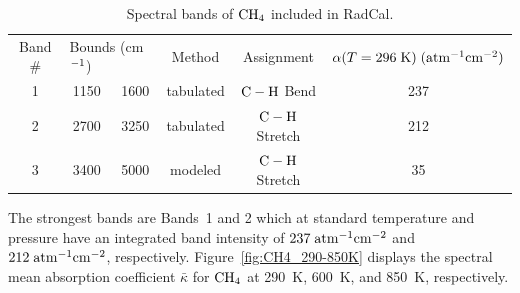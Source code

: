 \begin{table}[ht]
      \centering
      \caption{Spectral bands of $\rm CH_4$ included in RadCal.}
      \label{Table::CH4}
    \begin{tabular}{|c|c|c|c|c|c|}
    \hline
    Band \# & \multicolumn{2}{|l|}{Bounds (cm$\rm ^{-1}$) } & Method & Assignment & $\alpha(T=296 \; {\rm K}) \; (\rm {atm^{-1} cm^{-2}})$   \\
    \cline{1-6}
    1 & 1150 & 1600 & tabulated &  $\rm C-H$ Bend    & 237  \\
    2 & 2700 & 3250 & tabulated &  $\rm C-H$ Stretch & 212  \\
    3 & 3400 & 5000 & modeled   &  $\rm C-H$ Stretch &  35  \\
    \hline
   \end{tabular}
\end{table}
The strongest bands are Bands~1 and 2 which at standard temperature and pressure have an integrated band intensity of $237\;\rm {atm^{-1}cm^{-2}}$ and $212\;\rm {atm^{-1}cm^{-2}}$, respectively. Figure~\ref{fig:CH4_290-850K} displays the spectral mean absorption coefficient $\bar{\kappa}$ for $\rm CH_4$ at 290~K, 600~K, and 850~K, respectively.

